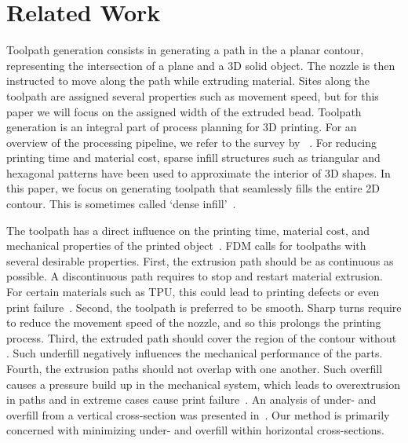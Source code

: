\section{Related Work}

Toolpath generation consists in generating a path in the a planar contour, representing the intersection of a plane and a 3D solid object.
The nozzle is then instructed to move along the path while extruding material.
Sites along the toolpath are assigned several properties such as movement speed, but for this paper we will focus on the assigned width of the extruded bead.
Toolpath generation is an integral part of process planning for 3D printing.
For an overview of the processing pipeline, we refer to the survey by \citeauthor{Livesu2017CGF}~\cite{Livesu2017CGF}.
For reducing printing time and material cost, sparse infill structures such as triangular and hexagonal patterns have been used to approximate the interior of 3D shapes.
In this paper, we focus on generating toolpath that seamlessly fills the entire 2D contour.
This is sometimes called `dense infill'~\cite{Livesu2017CGF}.

The toolpath has a direct influence on the printing time, material cost, and mechanical properties of the printed object~\cite{N.Turner2014,ahn2002anisotropic}.
FDM calls for toolpaths with several desirable properties.
First, the extrusion path should be as continuous as possible.
A discontinuous path requires to stop and restart material extrusion.
For certain materials\revise{}{,} such as TPU, this could lead to printing defects or even print failure~\cite{KUIPERS2019CAD}.
Second, the toolpath is preferred to be smooth.
Sharp turns require to reduce the movement speed of the nozzle, and so this prolongs the printing process.
Third, the extruded path should cover the region of the contour without .
Such underfill negatively influences the mechanical performance of the parts.
Fourth, the extrusion paths should not overlap with one another.
Such overfill causes a pressure build up in the mechanical system, which leads to overextrusion in  paths and in extreme cases cause print failure~\cite{KUIPERS2019CAD}.
An analysis of under- and overfill from a vertical cross-section was presented in~\cite{Han2002JMSE}. 
Our method is primarily concerned with minimizing under- and overfill within horizontal cross-sections.


